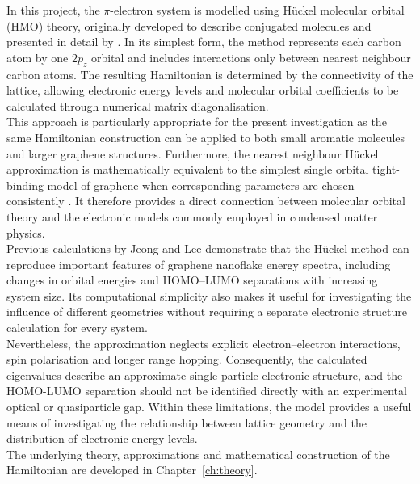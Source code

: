 \noindent In this project, the $\pi$-electron system is modelled using H\"uckel molecular orbital (HMO) theory, originally developed to describe conjugated molecules and presented in detail by \textcite{streitwieser_molecular_1964}. In its simplest form, the method represents each carbon atom by one $2p_z$ orbital and includes interactions only between nearest neighbour carbon atoms. The resulting Hamiltonian is determined by the connectivity of the lattice, allowing electronic energy levels and molecular orbital coefficients to be calculated through numerical matrix diagonalisation. \\

\noindent This approach is particularly appropriate for the present investigation as the same Hamiltonian construction can be applied to both small aromatic molecules and larger graphene structures. Furthermore, the nearest neighbour H\"uckel approximation is mathematically equivalent to the simplest single orbital tight-binding model of graphene when corresponding parameters are chosen consistently \parencite{castro_neto_electronic_2009}. It therefore provides a direct connection between molecular orbital theory and the electronic models commonly employed in condensed matter physics. \\

\noindent Previous calculations by Jeong and Lee \parencite{jeongCalculationElectronicStructures2024} demonstrate that the H\"uckel method can reproduce important features of graphene nanoflake energy spectra, including changes in orbital energies and HOMO--LUMO separations with increasing system size. Its computational simplicity also makes it useful for investigating the influence of different geometries without requiring a separate electronic structure calculation for every system. \\

\noindent Nevertheless, the approximation neglects explicit electron--electron interactions, spin polarisation and longer range hopping. Consequently, the calculated eigenvalues describe an approximate single particle electronic structure, and the HOMO-LUMO separation should not be identified directly with an experimental optical or quasiparticle gap. Within these limitations, the model provides a useful means of investigating the relationship between lattice geometry and the distribution of electronic energy levels. \\

\noindent The underlying theory, approximations and mathematical construction of the Hamiltonian are developed in Chapter~\ref{ch:theory}.


